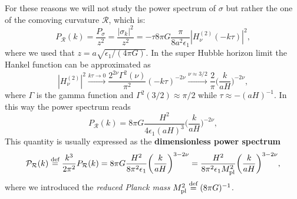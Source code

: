 For these reasons we will not study the power spectrum of $\sigma$ but rather the one of the comoving curvature $\mathcal{R}$, which is:
$${P_\mathcal{R}}(k)=\frac{{P}_\sigma}{z^2} =\frac{|\sigma_k|^2}{z^2}=-\tau8\pi G\frac{\pi}{8a^2\epsilon_1}|H_\nu^{(2)}(-k\tau)|^2,$$where we used that $z=a\sqrt{\epsilon_1/(4\pi G)}$. In the super Hubble horizon limit the Hankel function can be approximated as 
$$|H_\nu^{(2)}|^2\xrightarrow{k\tau\to0}\frac{2^{2\nu}\Gamma^2(\nu)}{\pi^2}(-k\tau)^{-2\nu}\xrightarrow{\nu\approx3/2}\frac{2}{\pi}\bigg(\frac{k}{aH}\bigg)^{-2\nu},$$ where $\Gamma$ is the gamma function and $\Gamma^2(3/2)\approx\pi/2$ while $\tau\approx-(aH)^{-1}$. In this way the power spectrum reads
\begin{equation}
    {P_\mathcal{R}}(k)=8\pi G\frac{H^2}{4\epsilon_1(aH)^3}\bigg(\frac{k}{aH}\bigg)^{-2\nu},\label{eq:Scalar_Power_spectrum}
\end{equation}
This quantity is usually expressed as the \textbf{dimensionless power spectrum}
\begin{equation}
    \mathcal{P}_\mathcal{R}(k)\stackrel{\text{def}}{=} \frac{k^3}{2\pi^2}P_\mathcal{R}(k)=8\pi G\frac{H^2}{8\pi^2\epsilon_1}\bigg(\frac{k}{aH}\bigg)^{3-2\nu}=\frac{H^2}{8\pi^2\epsilon_1 M_\text{pl}^2}\bigg(\frac{k}{aH}\bigg)^{3-2\nu},\label{eq:Scalar_Dimensionless_Power_spectrum}
\end{equation}
where we introduced the \textit{reduced Planck mass} $M_\text{pl}^2\stackrel{\text{def}}{=}(8\pi G)^{-1}$. 

